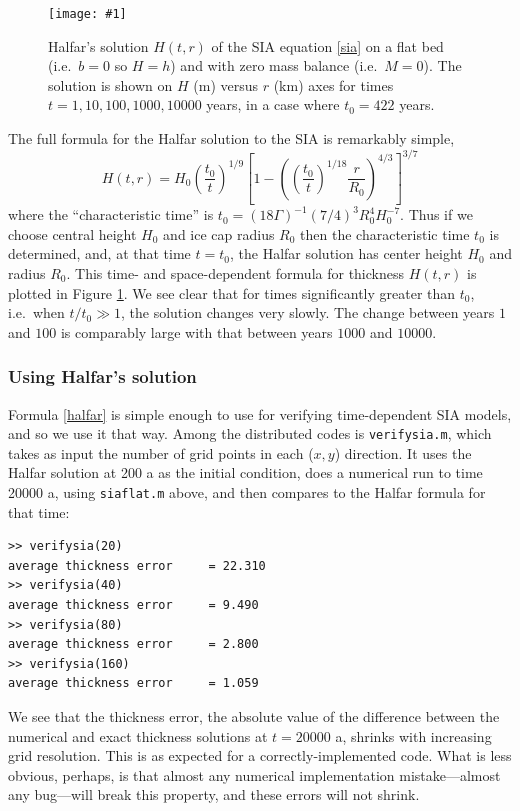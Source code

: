 \documentclass[titlepage,a4paper,final,12pt]{scrartcl}
\newcommand{\onefigsize}[3]{
\begin{figure}[ht]
\centering
\texttt{[image: \#1]}
\caption{#2}
\label{fig:#1}
\end{figure}}
\begin{document}
\onefigsize{siascaling}{Halfar's solution $H(t,r)$ of the SIA equation \eqref{sia} on a flat bed (i.e.~$b=0$ so $H=h$) and with zero mass balance (i.e.~$M=0$).  The solution is shown on $H$ (m) versus $r$ (km) axes for times $t=1,10,100,1000,10000$ years, in a case where $t_0=422$ years.}{5.5in}

The full formula for the Halfar solution to the SIA is remarkably simple,
\begin{equation}
H(t,r) = H_0 \left(\frac{t_0}{t}\right)^{1/9} \left[1 - \left(\left(\frac{t_0}{t}\right)^{1/18} \frac{r}{R_0}\right)^{4/3}\right]^{3/7} \label{halfar}
\end{equation}
where the ``characteristic time'' is $t_0 = (18 \Gamma)^{-1} (7/4)^3 R_0^4 H_0^{-7}$.  Thus if we choose central height $H_0$ and ice cap radius $R_0$ then the characteristic time $t_0$ is determined, and, at that time $t=t_0$, the Halfar solution has center height $H_0$ and radius $R_0$.  This time- and space-dependent formula for thickness $H(t,r)$ is plotted in Figure \ref{fig:siascaling}.  We see clear that for times significantly greater than $t_0$, i.e.~when $t/t_0 \gg 1$, the solution changes very slowly.  The change between years $1$ and $100$ is comparably large with that between years $1000$ and $10000$.

\subsubsection*{Using Halfar's solution}  Formula \eqref{halfar} is simple enough to use for verifying time-dependent SIA models, and so we use it that way.  Among the distributed codes is \texttt{verifysia.m}, which takes as input the number of grid points in each ($x,y$) direction.  It uses the Halfar solution at 200 a as the initial condition, does a numerical run to time 20000 a, using \texttt{siaflat.m} above, and then compares to the Halfar formula for that time:
\small
\begin{verbatim}
>> verifysia(20)
average thickness error     = 22.310
>> verifysia(40)
average thickness error     = 9.490
>> verifysia(80)
average thickness error     = 2.800
>> verifysia(160)
average thickness error     = 1.059
\end{verbatim}
\normalsize
We see that the thickness error, the absolute value of the difference between the numerical and exact thickness solutions at $t=20000$ a, shrinks with increasing grid resolution.  This is as expected for a correctly-implemented code.  What is less obvious, perhaps, is that almost any numerical implementation mistake---almost any bug---will break this property, and these errors will not shrink.
\end{document}
